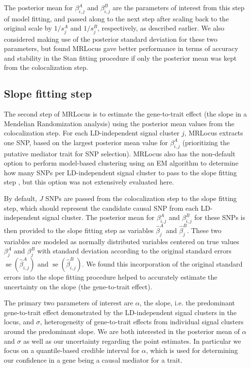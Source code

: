 \documentclass[11pt]{article}
\DeclareMathOperator{\se}{\textrm{se}}
\begin{document}
The posterior mean for $\beta_{i,j}^A$ and $\beta_{i,j}^B$ are the
parameters of interest from this step of model fitting, and passed
along to the next step after scaling back to the original scale by
$1/s_j^A$ and $1/s_j^B$, respectively, as described earlier.
We also considered making use of the posterior standard deviation
for these two parameters, but found MRLocus gave better performance in
terms of accuracy and stability in the Stan fitting procedure if only
the posterior mean was kept from the colocalization step.

\subsection{Slope fitting step} \label{sec:slope}

The second step of MRLocus is to estimate the gene-to-trait effect
(the slope in a Mendelian Randomization analysis) using the
posterior mean values from the colocalization step. For each
LD-independent signal cluster $j$, MRLocus extracts one SNP, based on the
largest posterior mean value for $\beta_{i,j}^A$ (prioritizing the
putative mediator trait for SNP selection). MRLocus also has the
non-default option to perform model-based clustering using 
an EM algorithm to determine how many SNPs per LD-independent
signal cluster to pass to the slope fitting step \citep{mclust}, but
this option was not extensively evaluated here.

By default, $J$ SNPs are passed from the colocalization step to the
slope fitting step, which should represent the candidate causal SNP
from each LD-independent signal cluster. The posterior mean for
$\beta_{i,j}^A$ and $\beta_{i,j}^B$ for these SNPs is then provided to
the slope fitting step as variables $\widehat{\beta}_j^A$ and
$\widehat{\beta}_j^B$. These two variables
are modeled as normally distributed variables centered on
true values $\beta_j^A$ and $\beta_j^B$
with standard deviation according to the original standard errors
$\se(\widehat{\beta}_{i,j}^A)$ and
$\se(\widehat{\beta}_{i,j}^B)$. We found this incorporation of the
original standard errors into the slope fitting procedure helped to
accurately estimate the uncertainty on the slope (the gene-to-trait
effect). 

The primary two parameters of interest are $\alpha$, the slope,
i.e. the predominant gene-to-trait effect demonstrated by the
LD-independent signal clusters in the locus, and $\sigma$,
heterogeneity of gene-to-trait effects from individual signal clusters
around the predominant slope. We are both interested in the posterior
mean of $\alpha$ and $\sigma$ as well as our uncertainty regarding the
point estimates. In particular we focus on a quantile-based credible
interval for $\alpha$, which is used for determining our confidence in
a gene being a causal mediator for a trait.
\end{document}
